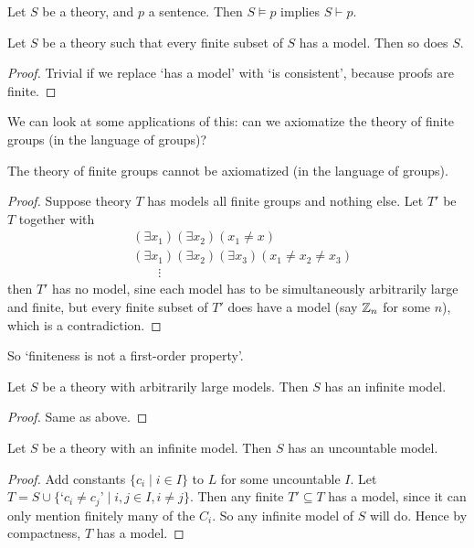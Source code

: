 \documentclass[a4paper, 10pt, twocolumn]{amsart}
\begin{document}
\begin{corollary}
  Let $S$ be a theory, and $p$ a sentence. Then $S \models p$ implies $S \vdash p$.
\end{corollary}

\begin{corollary}
  Let $S$ be a theory such that every finite subset of $S$ has a model. Then so does $S$.
\end{corollary}
\begin{proof}
  Trivial if we replace `has a model' with `is consistent', because proofs are finite.
\end{proof}

We can look at some applications of this: can we axiomatize the theory of finite groups (in the language of groups)?

\begin{corollary}
  The theory of finite groups cannot be axiomatized (in the language of groups).
\end{corollary}
\begin{proof}
  Suppose theory $T$ has models all finite groups and nothing else. Let $T'$ be $T$ together with 
  \begin{align*}
    &(\exists x_1) (\exists x_2) (x_1 \neq x) \\
    &(\exists x_1)(\exists x_2)(\exists x_3)(x_1 \neq x_2 \neq x_3)\\
    &\quad\quad\vdots 
  \end{align*}
  then $T'$ has no model, sine each model has to be simultaneously arbitrarily large and finite, but every finite subset of $T'$ does have a model (say $\mathbb{Z}_n$ for some $n$), which is a contradiction.
\end{proof}

So `finiteness is not a first-order property'.

\begin{corollary}
  Let $S$ be a theory with arbitrarily large models.
  Then $S$ has an infinite model.
\end{corollary}
\begin{proof}
  Same as above.
\end{proof}

\begin{corollary}
  Let $S$ be a theory with an infinite model. Then $S$ has an uncountable model.
\end{corollary}
\begin{proof}
  Add constants $\{c_i \mid i \in I\}$ to $L$ for some uncountable $I$.
  Let $T = S \cup \{\text{`}c_i \neq c_j\text{'} \mid i, j \in I, i \neq j\}$.
  Then any finite $T' \subseteq T$ has a model, since it can only mention finitely many of the $C_i$. So any infinite model of $S$ will do. Hence by compactness, $T$ has a model.
\end{proof}
\end{document}
